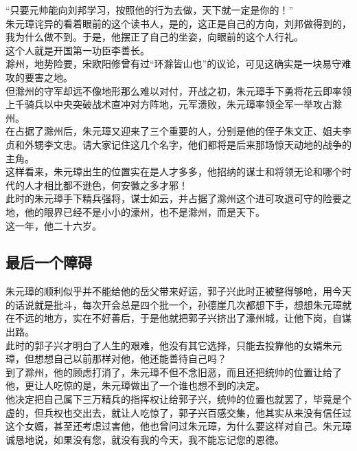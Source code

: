 \begin{multicols}{\theparacolNo}
“只要元帅能向刘邦学习，按照他的行为去做，天下就一定是你的！”\\

朱元璋诧异的看着眼前的这个读书人，是的，这正是自己的方向，刘邦做得到的，我为什么做不到。于是，他摆正了自己的坐姿，向眼前的这个人行礼。\\

这个人就是开国第一功臣李善长。\\

滁州，地势险要，宋欧阳修曾有过“环滁皆山也”的议论，可见这确实是一块易守难攻的要害之地。\\

但滁州的守军却远不像地形那么难以对付，开战之初，朱元璋手下勇将花云即率领上千骑兵以中央突破战术直冲对方阵地，元军溃败，朱元璋率领全军一举攻占滁州。\\

在占据了滁州后，朱元璋又迎来了三个重要的人，分别是他的侄子朱文正、姐夫李贞和外甥李文忠。请大家记住这几个名字，他们都将是后来那场惊天动地的战争的主角。\\

这样看来，朱元璋出生的位置实在是人才多多，他招纳的谋士和将领无论和哪个时代的人才相比都不逊色，何安徽之多才邪！\\

此时的朱元璋手下精兵强将，谋士如云，并占据了滁州这个进可攻退可守的险要之地，他的眼界已经不是小小的濠州，也不是滁州，而是天下。\\

这一年，他二十六岁。\\

\subsection{最后一个障碍}
朱元璋的顺利似乎并不能给他的岳父带来好运，郭子兴此时正被整得够呛，用今天的话说就是批斗，每次开会总是四个批一个，孙德崖几次都想下手，想想朱元璋就在不远的地方，实在不好善后，于是他就把郭子兴挤出了濠州城，让他下岗，自谋出路。\\

此时的郭子兴才明白了人生的艰难，他没有其它选择，只能去投靠他的女婿朱元璋，但想想自己以前那样对他，他还能善待自己吗？\\

到了滁州，他的顾虑打消了，朱元璋不但不念旧恶，而且还把统帅的位置让给了他，更让人吃惊的是，朱元璋做出了一个谁也想不到的决定。\\

他决定把自己属下三万精兵的指挥权让给郭子兴，统帅的位置也就罢了，毕竟是个虚的，但兵权也交出去，就让人吃惊了，郭子兴百感交集，他其实从来没有信任过这个女婿，甚至还考虑过害他，他也曾问过朱元璋，为什么要这样对自己。朱元璋诚恳地说，如果没有您，就没有我的今天，我不能忘记您的恩德。\\


\end{multicols}
